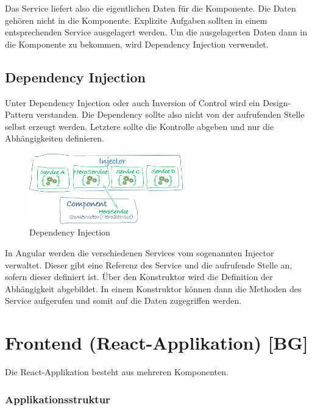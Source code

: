Das Service liefert also die eigentlichen Daten für die Komponente. Die Daten gehören nicht in die Komponente. Explizite Aufgaben sollten in einem entsprechenden Service ausgelagert werden. Um die ausgelagerten Daten dann in die Komponente zu bekommen, wird Dependency Injection verwendet.

\subsection{Dependency Injection}
Unter Dependency Injection oder auch Inversion of Control wird ein Design-Pattern verstanden. Die Dependency sollte also nicht von der aufrufenden Stelle selbst erzeugt werden. Letztere sollte die Kontrolle abgeben und nur die Abhängigkeiten definieren. 

\begin{figure}
  \centering
  \includegraphics[width=0.6\textwidth]{./pics/DependencyInjection.png}
  \caption{Dependency Injection}
\end{figure}
\pagebreak
In Angular werden die verschiedenen Services vom sogenannten Injector verwaltet. Dieser gibt eine Referenz des Service und die aufrufende Stelle an, sofern dieser definiert ist. Über den Konstruktor wird die Definition der Abhängigkeit abgebildet. In einem Konstruktor können dann die Methoden des Service aufgerufen und somit auf die Daten zugegriffen werden.
\cite{AngularService}

\section{Frontend (React-Applikation) [BG]}
Die React-Applikation besteht aus mehreren Komponenten.

\subsubsection{Applikationsstruktur}

